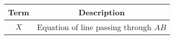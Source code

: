 \begin{tabular}[12ptx]{ |c| c|}
\hline\textbf{Term} & \textbf{Description}\\
\hline
$X$ & Equation of line passing through $AB$ \\
\hline
\end{tabular}


